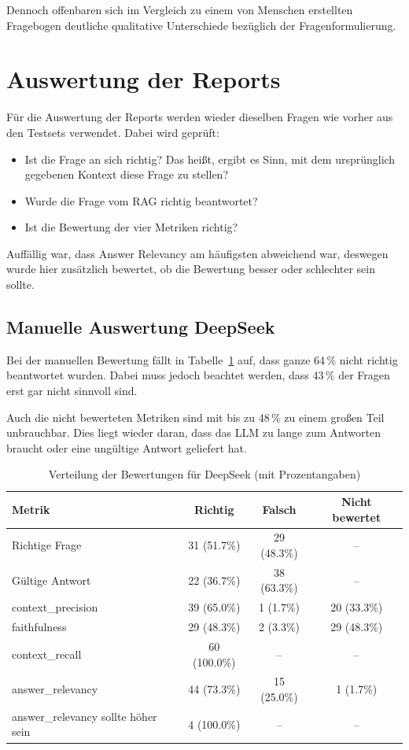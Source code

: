 Dennoch offenbaren sich im Vergleich zu einem von Menschen erstellten Fragebogen deutliche qualitative Unterschiede bezüglich der Fragenformulierung.

\section{Auswertung der Reports}
Für die Auswertung der Reports werden wieder dieselben Fragen wie vorher aus den Testsets verwendet.
Dabei wird geprüft:

\begin{itemize}
    \item Ist die Frage an sich richtig? Das heißt, ergibt es Sinn, mit dem ursprünglich gegebenen Kontext diese Frage zu stellen?
    \item Wurde die Frage vom RAG richtig beantwortet?
    \item Ist die Bewertung der vier Metriken richtig?
\end{itemize}

Auffällig war, dass Answer Relevancy am häufigsten abweichend war, deswegen wurde hier zusätzlich bewertet, ob die Bewertung besser oder schlechter sein sollte.

\subsection{Manuelle Auswertung DeepSeek}
Bei der manuellen Bewertung fällt in Tabelle~\ref{tab:deepseek_evaluation} auf, dass ganze 64\,\% nicht richtig beantwortet wurden.
Dabei muss jedoch beachtet werden, dass 43\,\% der Fragen erst gar nicht sinnvoll sind.

Auch die nicht bewerteten Metriken sind mit bis zu 48\,\% zu einem großen Teil unbrauchbar.
Dies liegt wieder daran, dass das LLM zu lange zum Antworten braucht oder eine ungültige Antwort geliefert hat.

\begin{table}[h!]
    \centering
    \caption[DeepSeek Verteilung der Bewertungen]{Verteilung der Bewertungen für DeepSeek (mit Prozentangaben)}
    \begin{tabular}{|l|c|c|c|}
    \hline
    \textbf{Metrik} & \textbf{Richtig} & \textbf{Falsch} & \textbf{Nicht bewertet} \\
    \hline
    Richtige Frage                        & 31 (51.7\%)  & 29 (48.3\%)  & -- \\
    Gültige Antwort                       & 22 (36.7\%)  & 38 (63.3\%)  & -- \\
    context\_precision           & 39 (65.0\%)  & 1 (1.7\%)    & 20 (33.3\%) \\
    faithfulness                 & 29 (48.3\%)  & 2 (3.3\%)    & 29 (48.3\%) \\
    context\_recall              & 60 (100.0\%) & --           & -- \\
    answer\_relevancy            & 44 (73.3\%)  & 15 (25.0\%)  & 1 (1.7\%) \\
    answer\_relevancy sollte höher sein & 4 (100.0\%) & --          & -- \\
    \hline
    \end{tabular}
    \label{tab:deepseek_evaluation}
\end{table}

